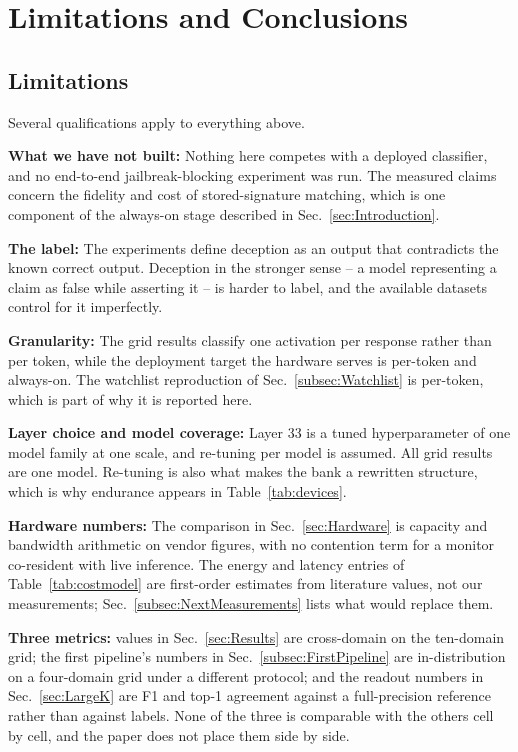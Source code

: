 \section{Limitations and Conclusions}
\label{sec:Conclusions}

\subsection{Limitations}
\label{subsec:Limitations}
Several qualifications apply to everything above.

\textbf{What we have not built:} Nothing here competes with a deployed
classifier, and no end-to-end jailbreak-blocking experiment was run. The
measured claims concern the fidelity and cost of stored-signature
matching, which is one component of the always-on stage described in
Sec.~\ref{sec:Introduction}.

\textbf{The label:} The experiments define deception as an output that
contradicts the known correct output. Deception in the stronger sense --
a model representing a claim as false while asserting it -- is harder to
label, and the available datasets control for it imperfectly.

\textbf{Granularity:} The grid results classify one activation per
response rather than per token, while the deployment target the hardware
serves is per-token and always-on. The watchlist reproduction of
Sec.~\ref{subsec:Watchlist} is per-token, which is part of why it is
reported here.

\textbf{Layer choice and model coverage:} Layer 33 is a tuned
hyperparameter of one model family at one scale, and re-tuning per model
is assumed. All grid results are one model. Re-tuning is also what makes
the bank a rewritten structure, which is why endurance appears in
Table~\ref{tab:devices}.

\textbf{Hardware numbers:} The comparison in Sec.~\ref{sec:Hardware} is
capacity and bandwidth arithmetic on vendor figures, with no contention
term for a monitor co-resident with live inference. The energy and
latency entries of Table~\ref{tab:costmodel} are first-order estimates
from literature values, not our measurements;
Sec.~\ref{subsec:NextMeasurements} lists what would replace them.

\textbf{Three metrics:} \auroc values in Sec.~\ref{sec:Results} are
cross-domain on the ten-domain grid; the first pipeline's numbers in
Sec.~\ref{subsec:FirstPipeline} are in-distribution on a four-domain
grid under a different protocol; and the readout numbers in
Sec.~\ref{sec:LargeK} are F1 and top-1 agreement against a
full-precision reference rather than against labels. None of the three is
comparable with the others cell by cell, and the paper does not place
them side by side.

